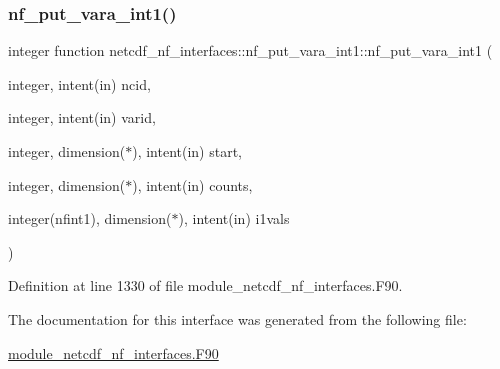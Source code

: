 \subsubsection{\texorpdfstring{nf\+\_\+put\+\_\+vara\+\_\+int1()}{nf\_put\_vara\_int1()}}
{\footnotesize\ttfamily integer function netcdf\+\_\+nf\+\_\+interfaces\+::nf\+\_\+put\+\_\+vara\+\_\+int1\+::nf\+\_\+put\+\_\+vara\+\_\+int1 (\begin{DoxyParamCaption}\item[{integer, intent(in)}]{ncid,  }\item[{integer, intent(in)}]{varid,  }\item[{integer, dimension($\ast$), intent(in)}]{start,  }\item[{integer, dimension($\ast$), intent(in)}]{counts,  }\item[{integer(nfint1), dimension($\ast$), intent(in)}]{i1vals }\end{DoxyParamCaption})}



Definition at line 1330 of file module\+\_\+netcdf\+\_\+nf\+\_\+interfaces.\+F90.



The documentation for this interface was generated from the following file\+:\begin{DoxyCompactItemize}
\item 
\hyperlink{module__netcdf__nf__interfaces_8F90}{module\+\_\+netcdf\+\_\+nf\+\_\+interfaces.\+F90}\end{DoxyCompactItemize}
